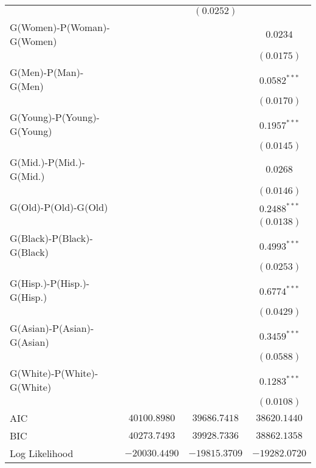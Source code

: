 \begin{center}
\begin{longtable}{l c c c}
                                    &                 & $(0.0252)$      &                 \\
G(Women)-P(Woman)-G(Women)          &                 &                 & $0.0234$        \\
                                    &                 &                 & $(0.0175)$      \\
G(Men)-P(Man)-G(Men)                &                 &                 & $0.0582^{***}$  \\
                                    &                 &                 & $(0.0170)$      \\
G(Young)-P(Young)-G(Young)          &                 &                 & $0.1957^{***}$  \\
                                    &                 &                 & $(0.0145)$      \\
G(Mid.)-P(Mid.)-G(Mid.)             &                 &                 & $0.0268$        \\
                                    &                 &                 & $(0.0146)$      \\
G(Old)-P(Old)-G(Old)                &                 &                 & $0.2488^{***}$  \\
                                    &                 &                 & $(0.0138)$      \\
G(Black)-P(Black)-G(Black)          &                 &                 & $0.4993^{***}$  \\
                                    &                 &                 & $(0.0253)$      \\
G(Hisp.)-P(Hisp.)-G(Hisp.)          &                 &                 & $0.6774^{***}$  \\
                                    &                 &                 & $(0.0429)$      \\
G(Asian)-P(Asian)-G(Asian)          &                 &                 & $0.3459^{***}$  \\
                                    &                 &                 & $(0.0588)$      \\
G(White)-P(White)-G(White)          &                 &                 & $0.1283^{***}$  \\
                                    &                 &                 & $(0.0108)$      \\
\midrule
AIC                                 & $40100.8980$    & $39686.7418$    & $38620.1440$    \\
BIC                                 & $40273.7493$    & $39928.7336$    & $38862.1358$    \\
Log Likelihood                      & $-20030.4490$   & $-19815.3709$   & $-19282.0720$   \\
\end{longtable}
\end{center}
